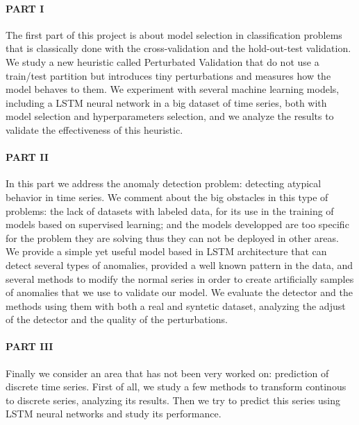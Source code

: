 \paragraph{PART I} The first part of this project is about model selection in classification problems that is classically  done with the cross-validation and the hold-out-test validation. We study a new heuristic called Perturbated Validation that do not use a train/test partition but introduces tiny perturbations and measures how the model behaves to them. We experiment with several machine learning models, including a LSTM neural network in a big dataset of time series, both with model selection and hyperparameters selection, and we analyze the results to validate the effectiveness of this heuristic.

\paragraph{PART II} In this part we address the anomaly detection problem: detecting atypical behavior in time series.
We comment about the big obstacles in this type of problems: the lack of datasets with labeled data, for its use in the training of models based on supervised learning; and the models developped are too specific for the problem they are solving thus they can not be deployed in other areas. We provide a simple yet useful model based in LSTM architecture that can detect several types of anomalies, provided a well known pattern in the data, and several methods to modify the normal series in order to create artificially samples of anomalies that we use to validate our model. We evaluate the detector and the methods using them with both a real and syntetic dataset, analyzing the adjust of the detector and the quality of the perturbations.

\paragraph{PART III} Finally we consider an area that has not been very worked on: prediction of discrete time series. First of all, we study a few methods to transform continous to discrete series, analyzing its results. Then we try to predict this series using LSTM neural networks and study its performance.

